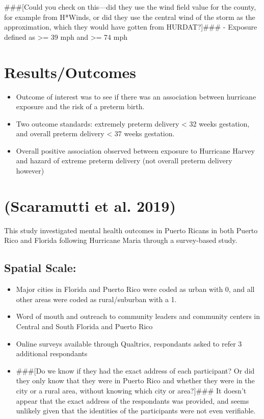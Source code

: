 \documentclass[
]{article}
\providecommand{\tightlist}{%
  \setlength{\itemsep}{0pt}\setlength{\parskip}{0pt}}
\begin{document}
\#\#\#{[}Could you check on this---did they use the wind field value for
the county, for example from H*Winds, or did they use the central wind
of the storm as the approximation, which they would have gotten from
HURDAT?{]}\#\#\# - Exposure defined as \textgreater{}= 39 mph and
\textgreater{}= 74 mph

\hypertarget{resultsoutcomes-3}{%
\section{Results/Outcomes}\label{resultsoutcomes-3}}

\begin{itemize}
\tightlist
\item
  Outcome of interest was to see if there was an association between
  hurricane exposure and the risk of a preterm birth.
\item
  Two outcome standards: extremely preterm delivery \textless{} 32 weeks
  gestation, and overall preterm delivery \textless{} 37 weeks
  gestation.
\item
  Overall positive association observed between exposure to Hurricane
  Harvey and hazard of extreme preterm delivery (not overall preterm
  delivery however)
\end{itemize}

\hypertarget{scaramutti2019mental}{%
\section{(Scaramutti et al. 2019)}\label{scaramutti2019mental}}

This study investigated mental health outcomes in Puerto Ricans in both
Puerto Rico and Florida following Hurricane Maria through a survey-based
study.

\hypertarget{spatial-scale-5}{%
\subsection{Spatial Scale:}\label{spatial-scale-5}}

\begin{itemize}
\tightlist
\item
  Major cities in Florida and Puerto Rico were coded as urban with 0,
  and all other areas were coded as rural/suburban with a 1.
\item
  Word of mouth and outreach to community leaders and community centers
  in Central and South Florida and Puerto Rico
\item
  Online surveys available through Qualtrics, respondants asked to refer
  3 additional respondants
\item
  \#\#\#{[}Do we know if they had the exact address of each participant?
  Or did they only know that they were in Puerto Rico and whether they
  were in the city or a rural area, without knowing which city or
  area?{]}\#\#\# It doesn't appear that the exact address of the
  respondants was provided, and seems unlikely given that the identities
  of the participants were not even verifiable.
\end{itemize}
\end{document}
